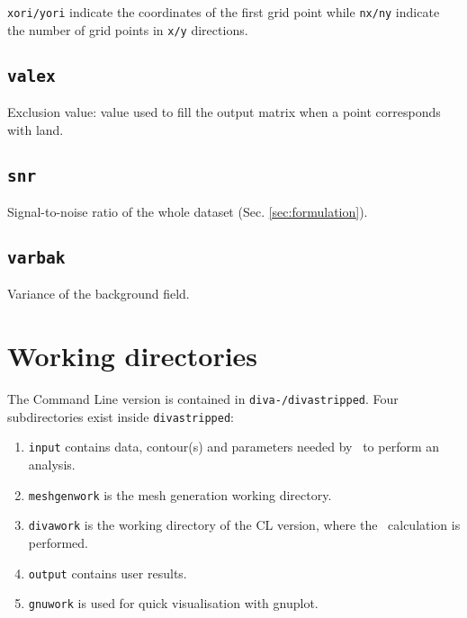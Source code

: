 \texttt{xori/yori} indicate the coordinates of the first grid point while \texttt{nx/ny} indicate the number of grid points in \texttt{x/y} directions.



\subsection{\texttt{valex}}

Exclusion value: value used to fill the output matrix when a point corresponds with land.


\subsection{\texttt{snr}}

Signal-to-noise ratio of the whole dataset (Sec. \ref{sec:formulation}).


\subsection{\texttt{varbak}}

Variance of the background field.


%

\section{Working directories}

The Command Line version is contained in \texttt{diva-\divaversion/divastripped}. Four subdirectories exist inside \texttt{divastripped}:

\begin{enumerate}
\item \texttt{input} contains data, contour(s) and parameters needed by \diva\, to perform an analysis.

\item \texttt{meshgenwork} is the mesh generation working directory.

\item \texttt{divawork} is the working directory of the CL version, where the \diva\, calculation is performed. 

\item \texttt{output} contains user results.

\item \texttt{gnuwork} is used for quick visualisation with gnuplot.

\end{enumerate}
